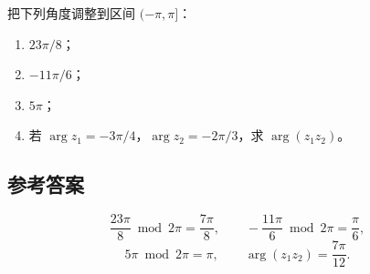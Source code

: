 \documentclass[UTF8,11pt]{ctexart}
\begin{document}
把下列角度调整到区间 $(-\pi,\pi]$：
\begin{enumerate}
  \item $23\pi/8$；
  \item $-11\pi/6$；
  \item $5\pi$；
  \item 若 $\arg z_1=-3\pi/4$，$\arg z_2=-2\pi/3$，求 $\arg(z_1z_2)$。
\end{enumerate}

\subsection*{参考答案}
\[
\frac{23\pi}{8}\bmod2\pi=\frac{7\pi}{8},
\qquad
-\frac{11\pi}{6}\bmod2\pi=\frac{\pi}{6},
\]
\[
5\pi\bmod2\pi=\pi,
\qquad
\arg(z_1z_2)=\frac{7\pi}{12}.
\]
\end{document}
